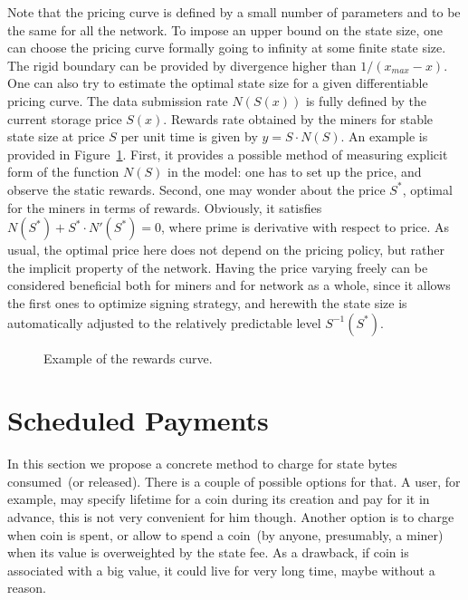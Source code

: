 \documentclass[]{llncs}   %
\begin{document}
Note that the pricing curve is defined by a small number of parameters and
to be the same for all the network. To impose an upper bound on the state
size, one can choose the pricing curve formally going to infinity at some finite
state size. The rigid boundary can be provided by divergence higher than
$1/(x_{max}-x)$. One can also try to estimate the optimal state size for a given
differentiable pricing curve. 
The data submission rate $N(S(x))$ is fully defined by the
current storage price $S(x)$.  Rewards rate obtained by the miners for stable
state size at price $S$ per unit time is given by $y = S \cdot N(S)$. An example is provided in
Figure~\ref{fig:rewards}. First, it provides a possible method of measuring
explicit form of the function $N(S)$ in the model: one has to set up the price,
and observe the static rewards. Second, one may wonder about the price $S^*$,
optimal for the miners in terms of rewards. Obviously, it satisfies
$N(S^*)+S^* \cdot N'(S^*)=0$, where prime %
is derivative with respect to price. As
usual, the optimal price here does not depend on the pricing policy, but rather
the implicit property of the network. Having the price varying freely can be
considered beneficial both for miners and for network as a whole, since it
allows the first ones to optimize signing strategy, and herewith the
state size is automatically adjusted to the relatively predictable level
$S^{-1} (S^*)$.

\begin{figure}[H]
    
    \caption{
        \label{fig:rewards} Example of the rewards curve.
    }
\end{figure}

\section{Scheduled Payments}
\label{sec:scheduled}

In this section we propose a concrete method to charge for state bytes consumed~(or released). There is a couple of possible options for that. A user, for example, may specify lifetime for a coin during its creation and pay for it in advance, this is not very convenient for him though. Another option is to charge when coin is spent, or allow to spend a coin~(by anyone, presumably, a miner) when its value is overweighted by the state fee. As a drawback, if coin is associated with a big value, it could live for very long time, maybe without a reason.
\end{document}

